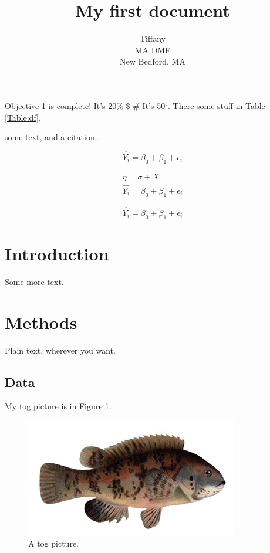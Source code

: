 \documentclass{article}
\author{Tiffany\\MA DMF\\New Bedford, MA}
\date{}
\title{My first document}
\begin{document}
\maketitle

\tableofcontents

\listoffigures
\listoftables
Objective 1 is complete! It's 20\% \$ \# It's 50$^\circ$. There some stuff in Table \ref{Table:df}.

some text, and a citation \citep{benoit2015generalized, maunder2004standardizing}.

\[ \hat{Y_i} = \beta_0 + \beta_1 + \epsilon_i  \]

\begin{eqnarray}
\eta = \sigma + X \\
\hat{Y_i} = \beta_0 + \beta_1 + \epsilon_i
\end{eqnarray}

\begin{equation}
\hat{Y_i} = \beta_0 + \beta_1 + \epsilon_i
\end{equation}



\section{Introduction}
 Some more text.

\section{Methods}
Plain text, wherever you want.
\subsection{Data}
My tog picture is in Figure \ref{Fig:tog}.

\begin{figure}[H]
	\centering
\includegraphics[scale=0.5]{tog.jpg}
\caption{A tog picture.}
\label{Fig:tog}
\end{figure}
\end{document}
